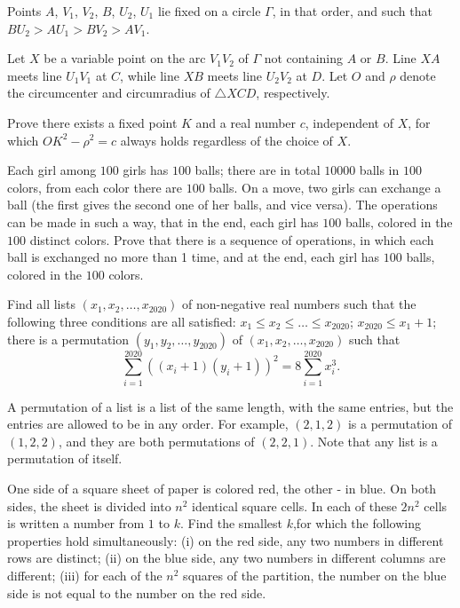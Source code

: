 \documentclass[11pt]{scrartcl}
\begin{document}
\begin{problem}[315159980103862]
	Points $A$, $V_1$, $V_2$, $B$, $U_2$, $U_1$ lie fixed on a circle $\Gamma$, in that order, and such that $BU_2 > AU_1 > BV_2 > AV_1$.

Let $X$ be a variable point on the arc $V_1 V_2$ of $\Gamma$ not containing $A$ or $B$. Line $XA$ meets line $U_1 V_1$ at $C$, while line $XB$ meets line $U_2 V_2$ at $D$. Let $O$ and $\rho$ denote the circumcenter and circumradius of $\triangle XCD$, respectively.

Prove there exists a fixed point $K$ and a real number $c$, independent of $X$, for which $OK^2 - \rho^2 = c$ always holds regardless of the choice of $X$.
\end{problem}
\begin{problem}[969197144236847]
	Each girl among $100$ girls has $100$ balls; there are in total $10000$ balls in $100$ colors, from each color there are $100$ balls. On a move, two girls can exchange a ball (the first gives the second one of her balls, and vice versa). The operations can be made in such a way, that in the end, each girl has $100$ balls, colored in the $100$ distinct colors. Prove that there is a sequence of operations, in which each ball is exchanged no more than 1 time, and at the end, each girl has $100$ balls, colored in the $100$ colors.
\end{problem}
\begin{problem}[914387802726278]
	Find all lists $(x_1, x_2, \ldots, x_{2020})$ of non-negative real numbers such that the following three conditions are all satisfied:
$x_1 \le x_2 \le \ldots \le x_{2020}$;
$x_{2020} \le x_1  + 1$;
there is a permutation $(y_1, y_2, \ldots, y_{2020})$ of $(x_1, x_2, \ldots, x_{2020})$ such that$$\sum_{i = 1}^{2020} ((x_i + 1)(y_i + 1))^2 = 8 \sum_{i = 1}^{2020} x_i^3.$$

A permutation of a list is a list of the same length, with the same entries, but the entries are allowed to be in any order. For example, $(2, 1, 2)$ is a permutation of $(1, 2, 2)$, and they are both permutations of $(2, 2, 1)$. Note that any list is a permutation of itself.
\end{problem}
\begin{problem}[8317584744128058138]
	One side of a square sheet of paper is colored red, the other - in blue. On both sides, the sheet is divided into $n^2$ identical square cells. In each of these $2n^2$ cells is written a number from $1$ to $k$. Find the smallest $k$,for which the following properties hold simultaneously:
(i) on the red side, any two numbers in different rows are distinct;
(ii) on the blue side, any two numbers in different columns are different;
(iii) for each of the $n^2$ squares of the partition, the number on the blue side is not equal to the number on the red side.
\end{problem}
\end{document}
